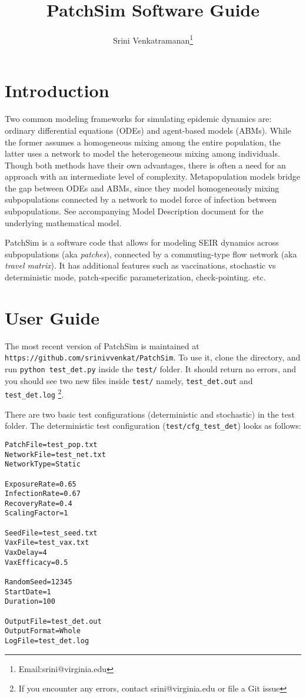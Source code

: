 \documentclass[10pt]{scrartcl}
\title{PatchSim Software Guide}
\author{Srini Venkatramanan\footnote{Email:srini@virginia.edu}}
\theoremstyle{definition}
\begin{document}
\maketitle

\section{Introduction}
Two common modeling frameworks for simulating epidemic dynamics are: ordinary 
differential equations (ODEs) and agent-based models (ABMs). While the former 
assumes a homogeneous mixing among the entire population, the latter uses a 
network to model the heterogeneous mixing among individuals. Though both 
methods have their own advantages, there is often a need for an approach with 
an intermediate level of complexity. Metapopulation models bridge the gap 
between ODEs and ABMs, since they model 
homogeneously mixing subpopulations connected by a network to model force of 
infection between subpopulations. See accompanying Model Description document 
for the underlying mathematical model.

PatchSim is a software code that allows for 
modeling SEIR dynamics across subpopulations (aka \emph{patches}), connected by 
a commuting-type flow network (aka \emph{travel matrix}). It has additional 
features such as vaccinations, stochastic vs deterministic mode, patch-specific 
parameterization, check-pointing. etc.

\section{User Guide}
\label{sec:user-guide}
The most recent version of PatchSim is maintained at 
\verb|https://github.com/srinivvenkat/PatchSim|. To use it, clone 
the directory, and run \verb|python test_det.py| inside the \verb|test/| 
folder. It should return no errors, and you should see two new files inside 
\verb|test/| namely, \verb|test_det.out| and \verb|test_det.log| \footnote{If 
you encounter any errors, contact srini@virginia.edu or file a Git issue}.

There are two basic test configurations (deterministic and stochastic) in the 
test folder. The deterministic test configuration (\verb|test/cfg_test_det|) 
looks as follows:
\begin{small}
\begin{center}
\begin{lstlisting}
PatchFile=test_pop.txt
NetworkFile=test_net.txt
NetworkType=Static

ExposureRate=0.65
InfectionRate=0.67
RecoveryRate=0.4
ScalingFactor=1

SeedFile=test_seed.txt
VaxFile=test_vax.txt
VaxDelay=4
VaxEfficacy=0.5

RandomSeed=12345
StartDate=1
Duration=100

OutputFile=test_det.out
OutputFormat=Whole
LogFile=test_det.log
\end{lstlisting}
\end{center}
\end{small}
\end{document}
